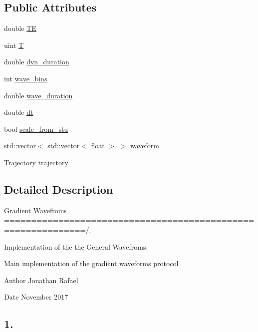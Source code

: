 \subsection*{Public Attributes}
\begin{DoxyCompactItemize}
\item 
double \hyperlink{class_gradient_waveform_a4e0c0163e36cc017f5b147e9ca3022e0}{TE}
\item 
uint \hyperlink{class_gradient_waveform_af2f45ff237ba41afe3ff5cedb7c1c966}{T}
\item 
double \hyperlink{class_gradient_waveform_a8608216ab7e5f002dcf6af4f869c5d27}{dyn\+\_\+duration}
\item 
int \hyperlink{class_gradient_waveform_ac2287a6ef99e35f0c1f97fc3ffb37d7b}{wave\+\_\+bins}
\item 
double \hyperlink{class_gradient_waveform_a02d695fa36713bd28d3c85d2bb7a877b}{wave\+\_\+duration}
\item 
double \hyperlink{class_gradient_waveform_a3eacca54a58dc574384f07899a9a6da3}{dt}
\item 
bool \hyperlink{class_gradient_waveform_a712eedb2165b3f889e27244fc9d91ebd}{scale\+\_\+from\+\_\+stu}
\item 
std\+::vector$<$ std\+::vector$<$ float $>$ $>$ \hyperlink{class_gradient_waveform_a565fce08abb28fe26664194c04faeaea}{waveform}
\item 
\hyperlink{class_trajectory}{Trajectory} \hyperlink{class_gradient_waveform_a83a7c844f86acee3b7ab12e7e70202af}{trajectory}
\end{DoxyCompactItemize}


\subsection{Detailed Description}
Gradient Wavefroms =============================================================/. 

Implementation of the the General Wavefroms.

Main implementation of the gradient waveforms protocol \begin{DoxyAuthor}{Author}
Jonathan Rafael 
\end{DoxyAuthor}
\begin{DoxyDate}{Date}
November 2017 \subsection*{1. }
\end{DoxyDate}


